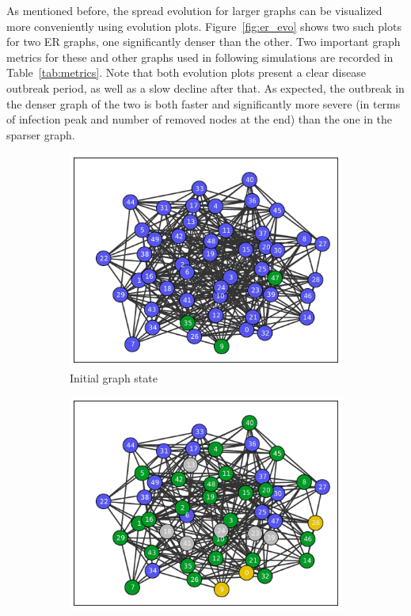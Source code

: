 \documentclass[11pt]{article} %
\begin{document}
As mentioned before, the spread evolution for larger graphs can be visualized
more conveniently using evolution plots. Figure~\ref{fig:er_evo} shows two such
plots for two ER graphs, one significantly denser than the other. Two important
graph metrics for these and other graphs used in following simulations are
recorded in Table~\ref{tab:metrics}. Note that both evolution plots present
a clear disease outbreak period, as well as a slow decline after that.
As expected, the outbreak in the denser graph of the two is both faster and
significantly more severe (in terms of infection peak and number of removed nodes
at the end) than the one in the sparser graph.

\begin{figure}[tbp]
  \begin{subfigure}[b]{0.5\textwidth}
    \centering
    \includegraphics[width=\textwidth]{figures/evo_ER_50_03_init}
    \caption{Initial graph state}
  \end{subfigure}
  \begin{subfigure}[b]{0.5\textwidth}
    \centering
    \includegraphics[width=\textwidth]{figures/evo_ER_50_03_10}

\end{subfigure}
\end{figure}
\end{document}
